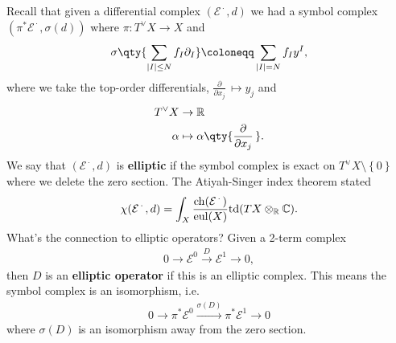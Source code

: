 \begin{remark}

Recall that given a differential complex
\(({ \mathcal{E} }^{{\,\cdot\,}}, d)\) we had a symbol complex
\(( \pi^* {\mathcal{E}}^{{\,\cdot\,}}, \sigma(d) )\) where
\(\pi: T^\vee X\to X\) and
\begin{align*} \sigma\qty{  \sum_{{\left\lvert {I} \right\rvert} \leq N} f_I {{\partial}}_I } \coloneqq\sum_{{\left\lvert {I} \right\rvert} = N} f_I y^I 
,\end{align*}
where we take the top-order differentials,
\({\frac{\partial }{\partial x_j}\,} \mapsto y_j\) and
\begin{align*}
T^\vee X &\to {\mathbb{R}}\\
\alpha &\mapsto \alpha\qty{{\frac{\partial }{\partial x_j}\,} }
.\end{align*}
We say that \(( {\mathcal{E} }^{{\,\cdot\,}}, d )\) is \textbf{elliptic}
if the symbol complex is exact on
\(T^\vee X \setminus\left\{{0}\right\}\) where we delete the zero
section. The Atiyah-Singer index theorem stated
\begin{align*}
\chi( {\mathcal{E}}^{{\,\cdot\,}}, d) = \int_X { \operatorname{ch}( { \mathcal{E} }^{{\,\cdot\,}}) \over {\operatorname{eul}}(X) } \mathrm{td}( TX\otimes_{\mathbb{R}}{\mathbb{C}})
.\end{align*}
What's the connection to elliptic operators? Given a 2-term complex
\begin{align*}
0 \to \mathcal{E}^0 \xrightarrow{D} \mathcal{E}^1 \to 0
,\end{align*}
then \(D\) is an \textbf{elliptic operator} if this is an elliptic
complex. This means the symbol complex is an isomorphism, i.e.~
\begin{align*}
0 \to \pi^* \mathcal{E}^0 \xrightarrow{\sigma(D)} \pi^* \mathcal{E}^1 \to 0
\end{align*}
where \(\sigma(D)\) is an isomorphism away from the zero section.

\end{remark}

